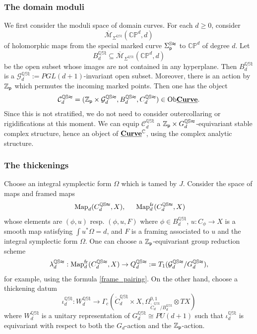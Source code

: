 \documentclass[reqno, 10pt]{amsart}
\numberwithin{equation}{section}
\numberwithin{equation}{section}
\renewcommand{\subset}{\subseteq}
\theoremstyle{definition}
\theoremstyle{remark}
\newcommand{\beqn}{\begin{equation*}}
\newcommand{\eeqn}{\end{equation*}}
\newcommand{\ov}{\overline}
\newcommand{\mb}{\mathbb}
\newcommand{\mc}{\mathcal}
\newcommand{\p}{{\sf p}}
\newcommand{\zp}{{{\mb Z}_{\sf p}}}
\newcommand{\uds}[1]{\underline{\smash{#1}}}
\begin{document}
\subsubsection{The domain moduli}

We first consider the moduli space of domain curves. For each $d\geq 0$, consider
\beqn
\ov{\mc M}_{\Sigma^{\mb{QSt}}}(\mb{CP}^d, d)
\eeqn
of holomorphic maps from the special marked curve $\Sigma_\p^{\mb{St}}$ to $\mb{CP}^d$ of degree $d$. Let
\beqn
B_d^{\mb{QSt}} \subset \ov{\mc M}{}_{\Sigma^{\mb{QSt}}}(\mb{CP}^d, d)
\eeqn
be the open subset whose images are not contained in any hyperplane. Then $B_d^{\mb{QSt}}$ is a ${\mc G}_d^{\mb{QSt}}:= PGL(d+1)$-invariant open subset. Moreover, there is an action by $\zp$ which permutes the incoming marked points. Then one has the object
\beqn
{\mc C}_d^{\mb{QSt}} = (\zp \times {\mc G}_d^{\mb{QSt}}, B_d^{\mb{QSt}}, C_d^{\mb{QSt}})\in {\rm Ob} \uds{\bf Curve}.
\eeqn 
Since this is not stratified, we do not need to consider outercollaring or rigidifications at this moment. We can equip ${\mc C}_d^{\mb{QSt}}$ a $\zp\times G_d^{\mb{QSt}}$-equivariant stable complex structure, hence an object of $\uds{\bf Curve}^{\mb{C}}$, using the complex analytic structure. 

\subsubsection{The thickenings}

Choose an integral symplectic form $\Omega$ which is tamed by $J$. Consider the space of maps and framed maps
\begin{align*}
&\ {\rm Map}_d(C_d^{\mb{QSt}}, X),\ &\ {\rm Map}_d^{\rm fr}(C_d^{\mb{QSt}}, X)
\end{align*}
whose elements are $(\phi, u)$ resp. $(\phi, u, F)$ where $\phi \in B_d^{\mb{QSt}}$, $u: C_\phi \to X$ is a smooth map satisfying $\int u^* \Omega = d$, and $F$ is a framing associated to $u$ and the integral symplectic form $\Omega$. 
One can choose a $\zp$-equivariant group reduction scheme
\beqn
\lambda_d^{\mb{QSt}}: {\rm Map}_d^{\rm fr}(C_d^{\mb{QSt}}, X) \to Q_d^{\mb{QSt}}:= T_1 ( {\mc G}_d^{\mb{QSt}}/ G_d^{\mb{QSt}}),
\eeqn
for example, using the formula \eqref{frame_pairing}. On the other hand, choose a thickening datum 
\beqn
\iota_d^{\mb{QSt}}: 
W_d^{\mb{QSt}} \to \Gamma_c( \mathring C_d^{\mb{QSt}}\times X, \Omega^{0,1}_{\mathring C_d^{\mb{QSt}} / B_d^{\mb{QSt}}} \otimes TX)
\eeqn
where $W_d^{\mb{QSt}}$ is a unitary representation of $G_d^{\mb{QSt}} \cong PU(d+1)$ such that $\iota_d^{\mb{QSt}}$ is equivariant with respect to both the $G_d$-action and the $\zp$-action. 
\end{document}
